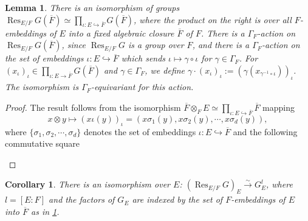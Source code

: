 \documentclass[11pt,a4paper]{article}
\theoremstyle{definition}
\theoremstyle{plain}
\newtheorem{Le}[shared]{Lemma}
\newtheorem{C}[shared]{Corollary}
\theoremstyle{remark}
\theoremstyle{plain}
\DeclareMathOperator{\Res}{Res}
\begin{document}
\begin{Le}\label{twistedlem1}
    There is an isomorphism of groups $\Res_{E/F}G(\overline{F}) \simeq \prod_{\iota: E \hookrightarrow \overline{F}} G(\overline{F})$, where the product on the right is over all $F$-embeddings of $E$ into a fixed algebraic closure $\overline{F}$ of $F$. There is a $\Gamma_F$-action on $\Res_{E/F}G(\overline{F})$, since $\Res_{E/F}G$ is a group over $F$, and there is a $\Gamma_F$-action on the set of embeddings $\iota: E \hookrightarrow \overline{F}$ which sends $\iota \mapsto \gamma \circ \iota$ for $\gamma \in \Gamma_F$. For $(x_{\iota})_{\iota} \in \prod_{\iota: E \xrightarrow[]{} \overline{F}} G(\overline{F})$ and $\gamma \in \Gamma_F$, we define $\gamma \cdot (x_{\iota})_{\iota} := (\gamma(x_{\gamma^{-1} \circ \iota}))_{\iota}$. The isomorphism is $\Gamma_F$-equivariant for this action.
\end{Le}
\begin{proof}
    The result follows from the isomorphism $\overline{F} \otimes_F E \simeq \prod_{\iota: E \hookrightarrow \overline{F}} \overline{F}$ mapping
    $$x \otimes y \mapsto (x\iota(y))_{\iota} = (x \sigma_1(y), x \sigma_2(y), \cdots, x \sigma_d(y)),$$
    where $\{ \sigma_1, \sigma_2, \cdots, \sigma_d\}$ denotes the set of embeddings $\iota: E \hookrightarrow \overline{F}$ and the following commutative square
\begin{center}
\quad
{}
\end{center}
\end{proof}

\begin{C}\label{twistedcor1}
    There is an isomorphism over $E$: $(\Res_{E/F}G)_E \xrightarrow[]{\sim} G_E^l$, where $l = [E:F]$ and the factors of $G_E$ are indexed by the set of $F$-embeddings of $E$ into $\overline{F}$ as in \ref{twistedlem1}.
\end{C}
\end{document}
